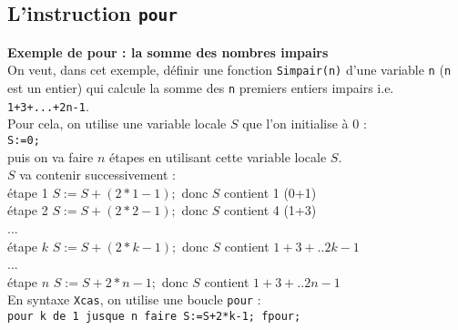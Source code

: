 \documentclass[12pt,a4paper]{book}
\begin{document}
\begin{giacjshere}
\section{L'instruction {\tt pour}}
{\bf Exemple de pour : la somme des nombres impairs}\\
On veut, dans cet exemple, d\'efinir une fonction {\tt Simpair(n)} d'une 
variable {\tt n} ({\tt n} est un entier) qui calcule la somme des {\tt n} 
premiers entiers impairs i.e. {\tt 1+3+...+2n-1}.\\
Pour cela, on utilise une variable locale $S$ que l'on initialise \`a 0 :\\ 
{\tt S:=0;}\\
puis on va faire $n$ \'etapes en utilisant cette variable locale $S$.\\ 
$S$ va contenir successivement :\\
\'etape 1 $S:=S+(2*1-1);$ donc $S$ contient 1 (0+1)\\
\'etape 2 $S:=S+(2*2-1);$ donc $S$ contient 4 (1+3)\\
...\\
\'etape $k$ $S:=S+(2*k-1);$ donc $S$ contient $1+3+..2k-1$\\
...\\
\'etape $n$ $S:=S+2*n-1;$ donc $S$ contient $1+3+..2n-1$\\
En syntaxe {\tt Xcas}, on utilise une boucle {\tt pour} :\\
{\tt pour k de 1 jusque n faire S:=S+2*k-1; fpour;}\\


\end{giacjshere}
\end{document}
